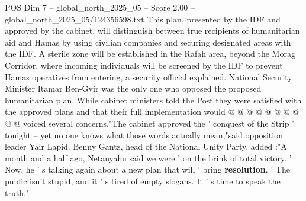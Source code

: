 \begin{textsample}{POS Dim 7 – global\_north\_2025\_05 – Score 2.00 – global\_north\_2025\_05/124356598.txt}
This plan, presented by the IDF and approved by the cabinet, will distinguish between true recipients of humanitarian aid and Hamas by using civilian companies and securing designated areas with the IDF.
A sterile zone will be established in the Rafah area, beyond the Morag Corridor, where incoming individuals will be screened by the IDF to prevent Hamas operatives from entering, a security official explained.
National Security Minister Itamar Ben-Gvir was the only one who opposed the proposed humanitarian plan.
While cabinet ministers told the Post they were satisfied with the approved plans and that their full implementation would @ @ @ @ @ @ @ @ @ @ voiced several concerns."The cabinet approved the ' conquest of the Strip ' tonight -- yet no one knows what those words actually mean,"said opposition leader Yair Lapid.
Benny Gantz, head of the National Unity Party, added :"A month and a half ago, Netanyahu said we were ' on the brink of total victory. ' Now, he ' s talking again about a new plan that will ' bring \textbf{resolution}. ' The public isn't stupid, and it ' s tired of empty slogans.
It ' s time to speak the truth."

\end{textsample}
